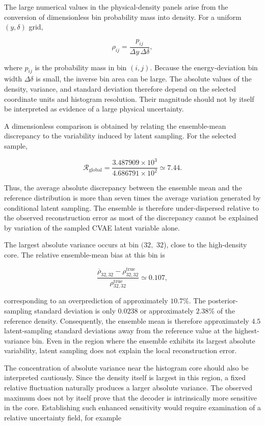 The large numerical values in the physical-density panels arise from the conversion of dimensionless bin probability mass into density. For a uniform \(( y , \delta )\) grid,

\begin{equation}
\label{eq:211}
\rho_{ij}=\frac{p_{ij}}{\Delta y\,\Delta\delta},
\end{equation}

where \(p_{i j}\) is the probability mass in bin \(( i , j ) .\) Because the energy-deviation bin width \(\Delta \delta\) is small, the inverse bin area can be large. The absolute values of the density, variance, and standard deviation therefore depend on the selected coordinate units and histogram resolution. Their magnitude should not by itself be interpreted as evidence of a large physical uncertainty.

A dimensionless comparison is obtained by relating the ensemble-mean discrepancy to the variability induced by latent sampling. For the selected sample,

\[
\mathcal R_{\mathrm{global}}=\frac{3.487909\times10^3}{4.686791\times10^2}\simeq7.44.
\]





Thus, the average absolute discrepancy between the ensemble mean and the reference distribution is more than seven times the average variation generated by conditional latent sampling. The ensemble is therefore under-dispersed relative to the observed reconstruction error as most of the discrepancy cannot be explained by variation of the sampled CVAE latent variable alone.

The largest absolute variance occurs at bin \(( 32 ,\) 32), close to the high-density core. The relative ensemble-mean bias at this bin is

\[\frac{\overline\rho_{32,32}-\rho_{32,32}^{\mathrm{true}}}{\rho_{32,32}^{\mathrm{true}}}\simeq0.107,\]

corresponding to an overprediction of approximately \(10.7 \% .\) The posterior-sampling standard deviation is only \(0.0238\) or approximately \(2.38 \%\) of the reference density. Consequently, the ensemble mean is therefore approximately \(4.5\) latent-sampling standard deviations away from the reference value at the highest-variance bin. Even in the region where the ensemble exhibits its largest absolute variability, latent sampling does not explain the local reconstruction error.

The concentration of absolute variance near the histogram core should also be interpreted cautiously. Since the density itself is largest in this region, a fixed relative fluctuation naturally produces a larger absolute variance. The observed maximum does not by itself prove that the decoder is intrinsically more sensitive in the core. Establishing such enhanced sensitivity would require examination of a relative uncertainty field, for example

